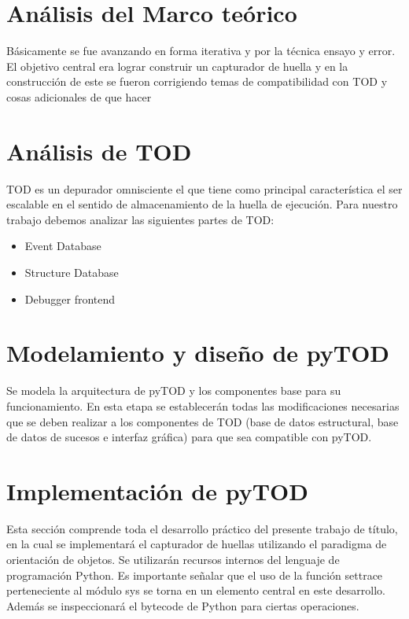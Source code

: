 \documentclass[12pt,a4paper]{report}
\begin{document}
	\section{Análisis del Marco teórico}

Básicamente se fue avanzando en forma iterativa y por la técnica ensayo y error.  El objetivo central era lograr construir un capturador de huella y en la construcción de este se fueron corrigiendo temas de compatibilidad con TOD y cosas adicionales de que hacer 

	\section{Análisis de TOD}

TOD es un depurador omnisciente el que tiene como principal característica el ser escalable en el sentido de almacenamiento de la huella de ejecución.  Para nuestro trabajo debemos analizar las siguientes partes de TOD:

\begin{itemize}
	\item Event Database
    \item Structure Database
    \item Debugger frontend
\end{itemize}

	\section{Modelamiento y diseño de pyTOD}

    Se modela la arquitectura de pyTOD y los componentes base para su funcionamiento.  En esta etapa se establecerán todas las modificaciones necesarias que se deben realizar a los componentes de TOD (base de datos estructural, base de datos de sucesos e interfaz gráfica) para que sea compatible con pyTOD.

	\section{Implementación de pyTOD}

    Esta sección comprende toda el desarrollo práctico del presente trabajo de título, en la cual se implementará el capturador de huellas utilizando el paradigma de orientación de objetos.  Se utilizarán recursos internos del lenguaje de programación Python.  Es importante señalar que el uso de la función settrace perteneciente al módulo sys se torna en un elemento central en este desarrollo.  Además se inspeccionará el bytecode de Python para ciertas operaciones.
\end{document}
